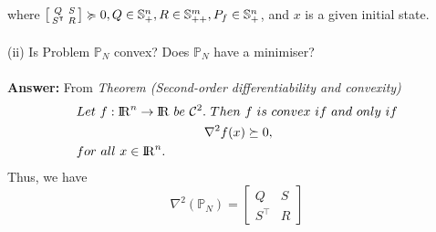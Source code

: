 \documentclass[a4paper,11pt,reqno]{amsart}
\newcommand{\R}{{\rm I\!R}}
\newcommand{\tran}{\intercal}
\DeclareMathOperator*{\minimise}{minimise}
\begin{document}
where $\begin{bsmallmatrix}Q&S\\S^{\tran}&R\end{bsmallmatrix}\succcurlyeq 0, Q\in \mathbb{S}^n_+, R\in \mathbb{S}^m_{++}, P_f\in \mathbb{S}^n_{+}$, and $x$ is a given initial state.
\\ \\
(ii) Is Problem $\mathbb{P}_N$ convex? Does $\mathbb{P}_N$ have a minimiser?
\\ \\
\textbf{Answer:}
From \textit{Theorem (Second-order differentiability and convexity)}
\begin{align}
    &Let\ f : \R^n\rightarrow\R\ be\ \mathcal{C}^2.\ Then\ f\ is\ convex\ if\ and\ only\ if
    \notag
    \\
    &\qquad\qquad\qquad\qquad\qquad \nabla ^2f(x)\succeq   0,
    \\
    &for\ all\ x \in\R^n.
    \notag
\end{align}
Thus, we have
\begin{equation}
    \nabla ^2(\mathbb{P}_N)=
    \begin{bmatrix}
        Q&S\\
        S^{\tran}&R
    \end{bmatrix}
\end{equation}
\end{document}
